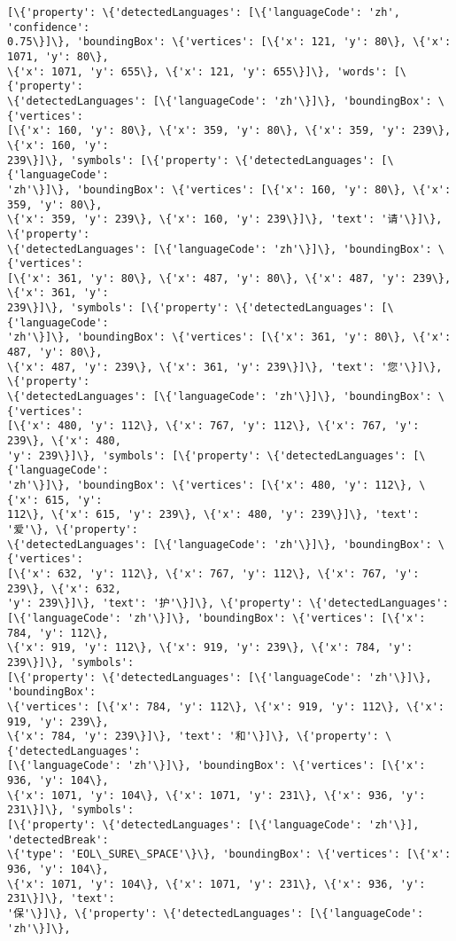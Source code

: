 \documentclass[11pt]{article}
\begin{document}
\begin{Verbatim}[commandchars=\\\{\}]
[\{'property': \{'detectedLanguages': [\{'languageCode': 'zh', 'confidence':
0.75\}]\}, 'boundingBox': \{'vertices': [\{'x': 121, 'y': 80\}, \{'x': 1071, 'y': 80\},
\{'x': 1071, 'y': 655\}, \{'x': 121, 'y': 655\}]\}, 'words': [\{'property':
\{'detectedLanguages': [\{'languageCode': 'zh'\}]\}, 'boundingBox': \{'vertices':
[\{'x': 160, 'y': 80\}, \{'x': 359, 'y': 80\}, \{'x': 359, 'y': 239\}, \{'x': 160, 'y':
239\}]\}, 'symbols': [\{'property': \{'detectedLanguages': [\{'languageCode':
'zh'\}]\}, 'boundingBox': \{'vertices': [\{'x': 160, 'y': 80\}, \{'x': 359, 'y': 80\},
\{'x': 359, 'y': 239\}, \{'x': 160, 'y': 239\}]\}, 'text': '请'\}]\}, \{'property':
\{'detectedLanguages': [\{'languageCode': 'zh'\}]\}, 'boundingBox': \{'vertices':
[\{'x': 361, 'y': 80\}, \{'x': 487, 'y': 80\}, \{'x': 487, 'y': 239\}, \{'x': 361, 'y':
239\}]\}, 'symbols': [\{'property': \{'detectedLanguages': [\{'languageCode':
'zh'\}]\}, 'boundingBox': \{'vertices': [\{'x': 361, 'y': 80\}, \{'x': 487, 'y': 80\},
\{'x': 487, 'y': 239\}, \{'x': 361, 'y': 239\}]\}, 'text': '您'\}]\}, \{'property':
\{'detectedLanguages': [\{'languageCode': 'zh'\}]\}, 'boundingBox': \{'vertices':
[\{'x': 480, 'y': 112\}, \{'x': 767, 'y': 112\}, \{'x': 767, 'y': 239\}, \{'x': 480,
'y': 239\}]\}, 'symbols': [\{'property': \{'detectedLanguages': [\{'languageCode':
'zh'\}]\}, 'boundingBox': \{'vertices': [\{'x': 480, 'y': 112\}, \{'x': 615, 'y':
112\}, \{'x': 615, 'y': 239\}, \{'x': 480, 'y': 239\}]\}, 'text': '爱'\}, \{'property':
\{'detectedLanguages': [\{'languageCode': 'zh'\}]\}, 'boundingBox': \{'vertices':
[\{'x': 632, 'y': 112\}, \{'x': 767, 'y': 112\}, \{'x': 767, 'y': 239\}, \{'x': 632,
'y': 239\}]\}, 'text': '护'\}]\}, \{'property': \{'detectedLanguages':
[\{'languageCode': 'zh'\}]\}, 'boundingBox': \{'vertices': [\{'x': 784, 'y': 112\},
\{'x': 919, 'y': 112\}, \{'x': 919, 'y': 239\}, \{'x': 784, 'y': 239\}]\}, 'symbols':
[\{'property': \{'detectedLanguages': [\{'languageCode': 'zh'\}]\}, 'boundingBox':
\{'vertices': [\{'x': 784, 'y': 112\}, \{'x': 919, 'y': 112\}, \{'x': 919, 'y': 239\},
\{'x': 784, 'y': 239\}]\}, 'text': '和'\}]\}, \{'property': \{'detectedLanguages':
[\{'languageCode': 'zh'\}]\}, 'boundingBox': \{'vertices': [\{'x': 936, 'y': 104\},
\{'x': 1071, 'y': 104\}, \{'x': 1071, 'y': 231\}, \{'x': 936, 'y': 231\}]\}, 'symbols':
[\{'property': \{'detectedLanguages': [\{'languageCode': 'zh'\}], 'detectedBreak':
\{'type': 'EOL\_SURE\_SPACE'\}\}, 'boundingBox': \{'vertices': [\{'x': 936, 'y': 104\},
\{'x': 1071, 'y': 104\}, \{'x': 1071, 'y': 231\}, \{'x': 936, 'y': 231\}]\}, 'text':
'保'\}]\}, \{'property': \{'detectedLanguages': [\{'languageCode': 'zh'\}]\},

\end{Verbatim}
\end{document}
